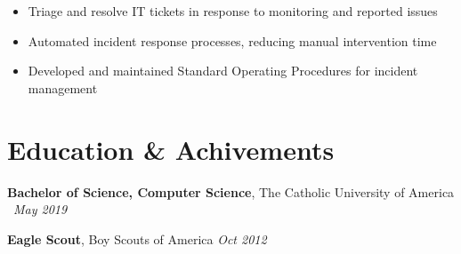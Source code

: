 \documentclass[11pt, a4paper]{article}
\begin{document}
 {

			\begin{itemize}
				\item Triage and resolve IT tickets in response to monitoring and reported issues
				\item Automated incident response processes, reducing manual intervention time
				\item Developed and maintained Standard Operating Procedures for incident management
			\end{itemize}
}

\section{Education \& Achivements}
\textbf{Bachelor of Science, Computer Science}, The Catholic University of America \hfill \, \textit{May 2019}

\textbf{Eagle Scout}, Boy Scouts of America \hfill \textit{Oct 2012}

% 
\end{document}
